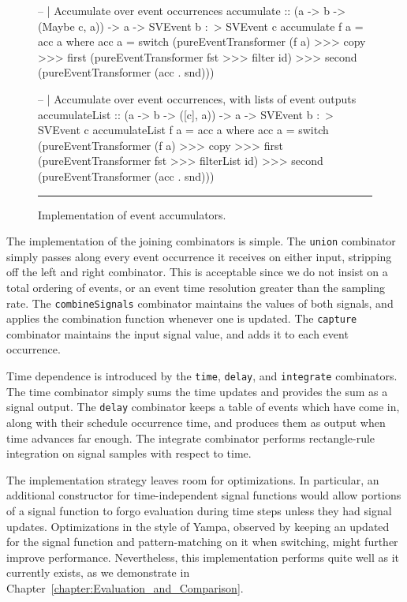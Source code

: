 \begin{figure}
\begin{code}
-- | Accumulate over event occurrences
accumulate :: (a -> b -> (Maybe c, a)) -> a -> SVEvent b :~> SVEvent c
accumulate f a = acc a
  where acc a = switch (pureEventTransformer (f a) >>>
                        copy >>>
                        first (pureEventTransformer fst >>> filter id) >>>
                        second (pureEventTransformer (acc . snd)))

-- | Accumulate over event occurrences, with lists of event outputs
accumulateList :: (a -> b -> ([c], a)) -> a -> SVEvent b :~> SVEvent c
accumulateList f a = acc a
  where acc a = switch (pureEventTransformer (f a) >>>
                        copy >>>
                        first (pureEventTransformer fst >>> filterList id) >>>
                        second (pureEventTransformer (acc . snd)))
\end{code}
\hrule
\caption{Implementation of event accumulators.}
\label{figure:accumulate_implementation}
\end{figure}

The implementation of the joining combinators is simple. The {\tt union}
combinator simply passes along every event occurrence it receives on either
input, stripping off the left and right combinator. This is acceptable since we
do not insist on a total ordering of events, or an event time resolution greater
than the sampling rate. The {\tt combineSignals} combinator maintains the values
of both signals, and applies the combination function whenever one is updated.
The {\tt capture} combinator maintains the input signal value, and adds it to
each event occurrence.

Time dependence is introduced by the {\tt time}, {\tt delay}, and {\tt integrate}
combinators. The time combinator simply sums the time updates and provides the
sum as a signal output. The {\tt delay} combinator keeps a table of events
which have come in, along with their schedule occurrence time, and produces
them as output when time advances far enough. The integrate combinator performs
rectangle-rule integration on signal samples with respect to time.

The implementation strategy leaves room for optimizations. In particular, an
additional constructor for time-independent signal functions would allow
portions of a signal function to forgo evaluation during time steps unless they
had signal updates. Optimizations in the style of Yampa, observed by keeping
an updated for the signal function and pattern-matching on it when switching,
might further improve performance. Nevertheless, this implementation performs
quite well as it currently exists, as we demonstrate in Chapter~\ref{chapter:Evaluation_and_Comparison}.
